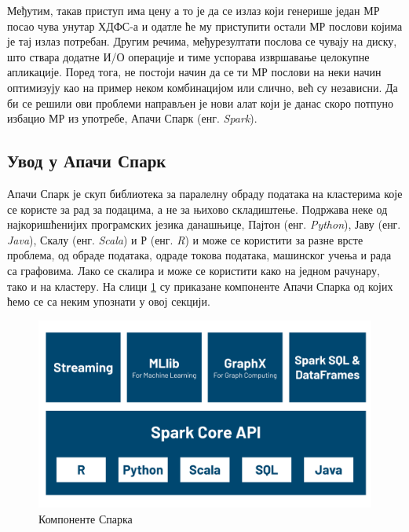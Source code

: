\documentclass[12pt,oneside]{memoir}
\begin{document}
Међутим, такав приступ има цену а то је да се излаз који генерише један МР посао чува унутар ХДФС-а и одатле ће му приступити остали МР послови којима је тај излаз потребан. Другим речима, међурезултати послова се чувају на диску, што ствара додатне И/О операције и тиме успорава извршавање целокупне апликације. Поред тога, не постоји начин да се ти МР послови на неки начин оптимизују као на пример неком комбинацијом или слично, већ су независни. Да би се решили ови проблеми направљен је нови алат који је данас скоро потпуно избацио МР из употребе, Апачи Спарк (енг. \textit{Spark}). \cite{hadoop_learning}

\subsection{Увод у Апачи Спарк}
\label{subsec:spark_intro}

Апачи Спарк је скуп библиотека за паралелну обраду података на кластерима које се користе за рад за подацима, а не за њихово складиштење. Подржава  неке од најкоришћенијих програмских језика данашњице, Пајтон (енг. \textit{Python}), Јаву (енг. \textit{Java}), Скалу (енг. \textit{Scala}) и Р (енг. \textit{R}) и може се користити за разне врсте проблема, од обраде података, одраде токова података, машинског учења и рада са графовима. Лако се скалира и може се користити како на једном рачунару, тако и на кластеру. На слици \ref{fig:spark_kompot} су приказане компоненте Апачи Спарка од којих ћемо се са неким упознати у овој секцији. \cite{spark_guide}

\begin{figure}[!ht]
  \centering
  \includegraphics[width=1\textwidth]{pictures/spark_components.png}
  \caption{Компоненте Спарка}
  \label{fig:spark_kompot}
\end{figure}
\end{document}
